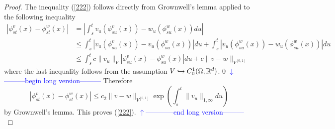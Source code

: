 \documentclass[noinfoline]{imsart}
\def\Ver{1}
\def\LongVer{0}
\begin{document}
\begin{proof}
The inequality (\ref{222})  follows directly from Grownwell's lemma  applied to the following inequality
\begin{align*}
|\phi_{st}^v(x) - \phi_{st}^w(x)| &= \left| \int_{s}^t v_u (\phi_{su}^v(x)) -  w_u (\phi_{su}^w(x)) du\right|\\
&\leq \int_{s}^t |v_u (\phi_{su}^v(x)) -  v_u (\phi_{su}^w(x)) |du + \int_{s}^t |v_u (\phi_{su}^w(x)) -  w_u (\phi_{su}^w(x)) |du\\
& \leq \int_{s}^t c\|v_u\|_{V} |\phi_{su}^v(x) -  \phi_{su}^w(x)|du  +  c\|v - w  \|_{V^{[0,1]}}
\end{align*}
where the last inequality follows from the assumption $V\hookrightarrow C_0^1(\Omega, \Bbb R^d)$.
\if\Ver\LongVer{
{\flushleft\textcolor{blue}{$\downarrow$---------begin long version---------}}\newline
 Therefore
 \[  |\phi_{st}^v(x) - \phi_{st}^w(x)| \leq  c_2\|v - w  \|_{V^{[0,1]}} \exp\left( \int_{s}^t \|v_u\|_{1,\infty}  du \right) \]
 by Grownwell's lemma.  This proves (\ref{222}).
 {\flushleft\textcolor{blue}{$\uparrow$------------end long version---------}}\newline
} \fi






\end{proof}
\end{document}
